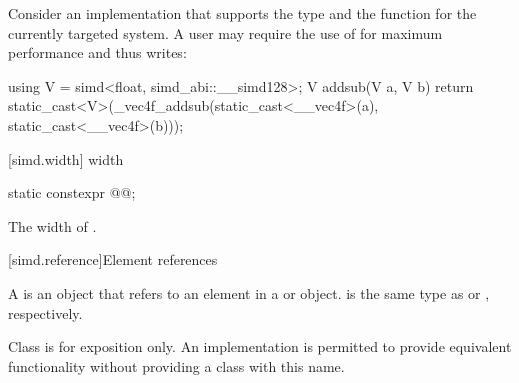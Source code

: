 \begin{example}
  Consider an implementation that supports the type  and the function  for the currently targeted system.
  A user may require the use of  for maximum performance and thus writes:
  \begin{codeblock}
    using V = simd<float, simd_abi::__simd128>;
    V addsub(V a, V b) {
      return static_cast<V>(_vec4f_addsub(static_cast<__vec4f>(a), static_cast<__vec4f>(b)));
    }
  \end{codeblock}
\end{example}

[simd.width]{ width}

\begin{itemdecl}
static constexpr @@;
\end{itemdecl}

\begin{itemdescr}
  \pnum\returns
  The width of .
\end{itemdescr}

[simd.reference]{Element references}

\pnum
A  is an object that refers to an element in a  or  object.  is the same type as  or , respectively.

\pnum
Class  is for exposition only. An implementation is permitted to provide equivalent functionality without providing a class with this name.

